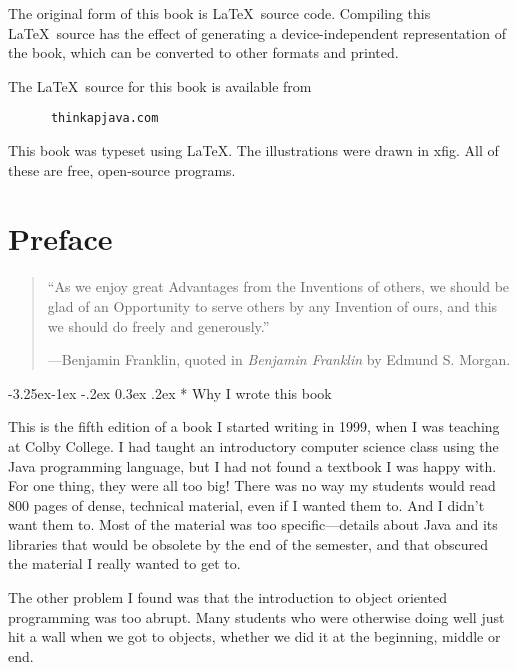 \documentclass{book}
\makeatletter
\renewcommand\subsection{\@startsection {subsection}{2}{0mm}%
    {-3.25ex\@plus -1ex \@minus -.2ex}%
    {0.3ex \@plus .2ex}%
    {\normalfont\large\bfseries}}
\makeatother
\begin{document}
The original form of this book is \LaTeX\ source code.  Compiling this
\LaTeX\ source has the effect of generating a device-independent
representation of the book, which can be converted to other formats
and printed.

The \LaTeX\ source for this book is available from

\begin{verbatim}
      thinkapjava.com
\end{verbatim}

This book was typeset using \LaTeX .  The illustrations were
drawn in xfig.  All of these are free, open-source programs.

\vspace{0.25in}



\chapter{Preface}

\begin{quote}
``As we enjoy great Advantages from the Inventions of others,
we should be glad of an Opportunity to serve others by any
Invention of ours, and this we should do freely and generously.''

---Benjamin Franklin, quoted in {\em Benjamin Franklin} by
Edmund S. Morgan.
\end{quote}

\subsection* {Why I wrote this book}

This is the fifth edition of a book I started writing in 1999,
when I was teaching at Colby College.  I had taught an introductory
computer science class using the Java programming language, but I
had not found a textbook I was happy with.  For one thing,
they were all too big!  There was no way my students would read
800 pages of dense, technical material, even if I wanted them to.
And I didn't want them to.  Most of the material was too
specific---details about Java and its libraries that would be obsolete
by the end of the semester, and that obscured the material I really
wanted to get to.

The other problem I found was that the introduction to object
oriented programming was too abrupt.  Many students who were otherwise
doing well just hit a wall when we got to objects, whether we did
it at the beginning, middle or end.
\end{document}
